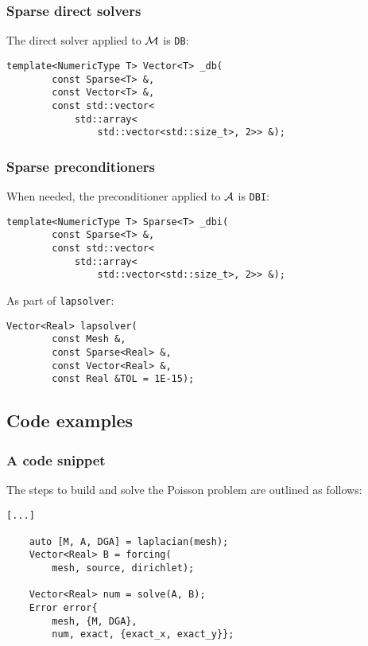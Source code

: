 \begin{frame}[fragile]
    \frametitle{Sparse direct solvers}

    The direct solver applied to $\mathcal{M}$ is \lstinline{DB}:

    \begin{lstlisting}[style=cpp]
    template<NumericType T> Vector<T> _db(
        const Sparse<T> &, 
        const Vector<T> &, 
        const std::vector<
            std::array<
                std::vector<std::size_t>, 2>> &);
    \end{lstlisting}
\end{frame}

\begin{frame}[fragile]
    \frametitle{Sparse preconditioners}

    When needed, the preconditioner applied to $\mathcal{A}$ is \lstinline{DBI}:

    \begin{lstlisting}[style=cpp]
    template<NumericType T> Sparse<T> _dbi(
        const Sparse<T> &, 
        const std::vector<
            std::array<
                std::vector<std::size_t>, 2>> &);
    \end{lstlisting}

    As part of \lstinline{lapsolver}:

    \begin{lstlisting}[style=cpp]
    Vector<Real> lapsolver(
        const Mesh &, 
        const Sparse<Real> &, 
        const Vector<Real> &, 
        const Real &TOL = 1E-15);
    \end{lstlisting}
\end{frame}

\subsection{Code examples}

\begin{frame}[fragile]
    \frametitle{A code snippet}

    The steps to build and solve the Poisson problem are outlined as follows:

    \begin{lstlisting}[style=cpp]
    [...]

    auto [M, A, DGA] = laplacian(mesh);
    Vector<Real> B = forcing(
        mesh, source, dirichlet);

    Vector<Real> num = solve(A, B);
    Error error{
        mesh, {M, DGA}, 
        num, exact, {exact_x, exact_y}};
    \end{lstlisting}

\end{frame}